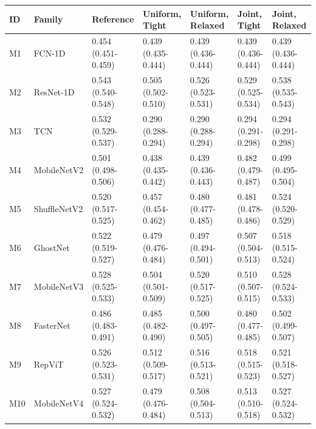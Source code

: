 \begin{tabular}{lllllll}
\toprule
ID & Family & Reference & Uniform, Tight & Uniform, Relaxed & Joint, Tight & Joint, Relaxed \\
\midrule
M1 & FCN-1D & 0.454 (0.451-0.459) & 0.439 (0.435-0.444) & 0.439 (0.436-0.444) & 0.439 (0.436-0.444) & 0.439 (0.436-0.444) \\
M2 & ResNet-1D & 0.543 (0.540-0.548) & 0.505 (0.502-0.510) & 0.526 (0.523-0.531) & 0.529 (0.525-0.534) & 0.538 (0.535-0.543) \\
M3 & TCN & 0.532 (0.529-0.537) & 0.290 (0.288-0.294) & 0.290 (0.288-0.294) & 0.294 (0.291-0.298) & 0.294 (0.291-0.298) \\
M4 & MobileNetV2 & 0.501 (0.498-0.506) & 0.438 (0.435-0.442) & 0.439 (0.436-0.443) & 0.482 (0.479-0.487) & 0.499 (0.495-0.504) \\
M5 & ShuffleNetV2 & 0.520 (0.517-0.525) & 0.457 (0.454-0.462) & 0.480 (0.477-0.485) & 0.481 (0.478-0.486) & 0.524 (0.520-0.529) \\
M6 & GhostNet & 0.522 (0.519-0.527) & 0.479 (0.476-0.484) & 0.497 (0.494-0.501) & 0.507 (0.504-0.513) & 0.518 (0.515-0.524) \\
M7 & MobileNetV3 & 0.528 (0.525-0.533) & 0.504 (0.501-0.509) & 0.520 (0.517-0.525) & 0.510 (0.507-0.515) & 0.528 (0.524-0.533) \\
M8 & FasterNet & 0.486 (0.483-0.491) & 0.485 (0.482-0.490) & 0.500 (0.497-0.505) & 0.480 (0.477-0.485) & 0.502 (0.499-0.507) \\
M9 & RepViT & 0.526 (0.523-0.531) & 0.512 (0.509-0.517) & 0.516 (0.513-0.521) & 0.518 (0.515-0.523) & 0.521 (0.518-0.527) \\
M10 & MobileNetV4 & 0.527 (0.524-0.532) & 0.479 (0.476-0.484) & 0.508 (0.504-0.513) & 0.513 (0.510-0.518) & 0.527 (0.524-0.532) \\
\bottomrule
\end{tabular}
